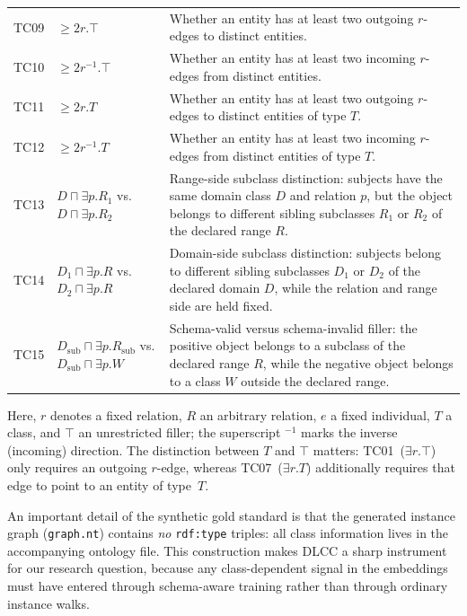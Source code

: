 \documentclass[a4paper,oneside,bibliography=totoc]{scrbook}
\begin{document}
\begin{table}[htbp]
\begin{tabularx}{\textwidth}{@{}c >{\raggedright\arraybackslash}p{} >{\raggedright\arraybackslash}X@{}}
TC09 &
$\geq 2r.\top$
& Whether an entity has at least two outgoing $r$-edges to distinct entities. \\

TC10 &
$\geq 2r^{-1}.\top$
& Whether an entity has at least two incoming $r$-edges from distinct entities. \\

TC11 &
$\geq 2r.T$
& Whether an entity has at least two outgoing $r$-edges to distinct entities of type $T$. \\

TC12 &
$\geq 2r^{-1}.T$
& Whether an entity has at least two incoming $r$-edges from distinct entities of type $T$. \\

\midrule

TC13 &
$D \sqcap \exists p.R_1$ vs. $D \sqcap \exists p.R_2$
& Range-side subclass distinction: subjects have the same domain class $D$ and relation $p$, but the object belongs to different sibling subclasses $R_1$ or $R_2$ of the declared range $R$. \\

TC14 &
$D_1 \sqcap \exists p.R$ vs. $D_2 \sqcap \exists p.R$
& Domain-side subclass distinction: subjects belong to different sibling subclasses $D_1$ or $D_2$ of the declared domain $D$, while the relation and range side are held fixed. \\

TC15 &
$D_{\mathrm{sub}} \sqcap \exists p.R_{\mathrm{sub}}$ vs. $D_{\mathrm{sub}} \sqcap \exists p.W$
& Schema-valid versus schema-invalid filler: the positive object belongs to a subclass of the declared range $R$, while the negative object belongs to a class $W$ outside the declared range. \\

\bottomrule
\end{tabularx}
\end{table}

Here, $r$ denotes a fixed relation, $R$ an arbitrary relation, $e$ a fixed
individual, $T$ a class, and $\top$ an unrestricted filler; the superscript
${}^{-1}$ marks the inverse (incoming) direction. The distinction between $T$
and $\top$ matters: TC01~($\exists r.\top$) only requires an outgoing
$r$-edge, whereas TC07~($\exists r.T$) additionally requires that edge to point
to an entity of type~$T$.

An important detail of the synthetic gold standard is that the generated
instance graph (\texttt{graph.nt}) contains \emph{no} \texttt{rdf:type}
triples: all class information lives in the accompanying ontology file. This
construction makes DLCC a sharp instrument for our research question, because
any class-dependent signal in the embeddings must have entered through
schema-aware training rather than through ordinary instance walks.
\end{document}
